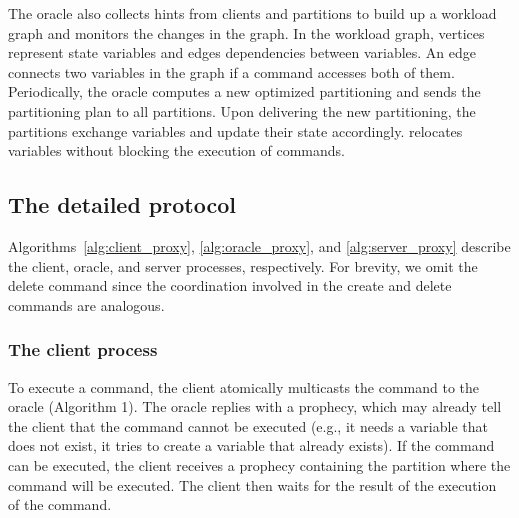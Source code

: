 The oracle also collects hints from clients and partitions to 
build up a workload graph and monitors the changes in the graph. 
In the workload graph, vertices represent state variables and edges dependencies between variables.
An edge connects two variables in the graph if a command accesses both of them.
Periodically, the oracle computes a new optimized partitioning and sends the partitioning plan to all partitions. 
Upon delivering the new partitioning, 
the partitions exchange variables and update their state accordingly.
\dynastar relocates variables without blocking the execution of commands.


\subsection{The detailed protocol}
\label{sec:detailed}

Algorithms~\ref{alg:client_proxy}, \ref{alg:oracle_proxy}, and \ref{alg:server_proxy} describe the client, oracle, and server processes, respectively. 
For brevity, we omit the delete command since the coordination involved in the create and delete commands are analogous. 


\subsubsection{The client process} 

To execute a command, the client atomically multicasts the command to the oracle (Algorithm 1).
The oracle replies with a prophecy, which may already tell the client that the command cannot be executed (e.g., it needs a variable that does not exist, it tries to create a variable that already exists).
If the command can be executed, the client receives a prophecy containing the partition where the command will be executed. The client then waits for the result of the execution of the command.




